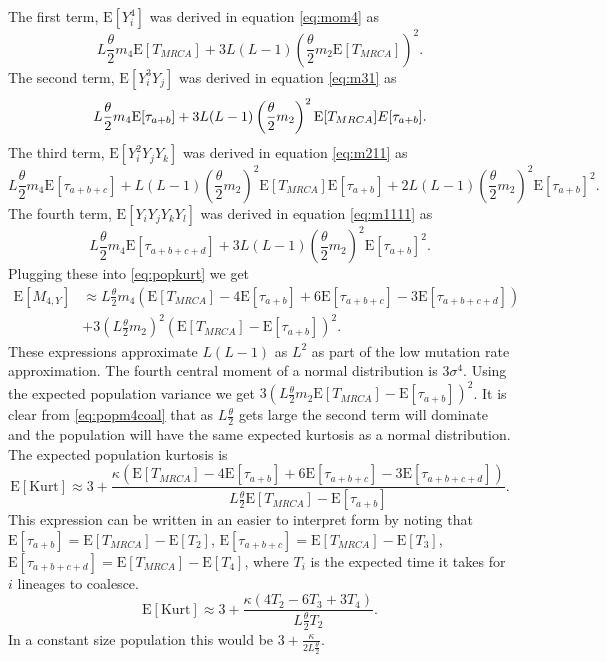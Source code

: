 \documentclass{article}
\newcommand{\T}{\frac{\theta}{2}}
\newcommand{\E}{\mathrm{E}}
\begin{document}
The first term, $\E[Y_i^4]$ was derived in equation \eqref{eq:mom4} as
\begin{equation*}
  L\T m_4 \E[T_{MRCA}] + 3L(L-1)\left( \T m_2 \E[T_{MRCA}] \right)^2.
\end{equation*}
The second term, $\E[Y_i^3Y_j]$ was derived in equation \eqref{eq:m31} as
\begin{equation*}
  L \T m_4 \E[\tau_{a+b}] + 3L(L-1) \left(\T m_2\right)^2 \E[T_{MRCA}]\\E[\tau_{a+b}].
\end{equation*}
The third term, $\E[Y_i^2Y_jY_k]$ was derived in equation \eqref{eq:m211} as
\begin{equation*}
  L \T m_4 \E[\tau_{a+b+c}] + L(L-1)\left(\T m_2\right)^2\E[T_{MRCA}]\E[\tau_{a+b}] +
  2L(L-1) \left(\T m_2\right)^2\E[\tau_{a+b}]^2.
\end{equation*}
The fourth term, $\E[Y_iY_jY_kY_l]$ was derived in equation \eqref{eq:m1111} as
\begin{equation*}
  L \T m_4 \E[\tau_{a+b+c+d}] + 3L(L-1)\left(\T m_2\right)^2\E[\tau_{a+b}]^2.
\end{equation*}
Plugging these into \eqref{eq:popkurt} we get
\begin{align}
  \label{eq:popm4coal}
  \E[M_{4,Y}] &\approx L \T m_4 \left( \E[T_{MRCA}] - 4\E[\tau_{a+b}] + 6\E[\tau_{a+b+c}] -3\E[\tau_{a+b+c+d}] \right)\nonumber \\
  &+ 3\left( L \T m_2 \right)^2\left(\E[T_{MRCA}]- \E[\tau_{a+b}]\right)^2.
\end{align}
These expressions approximate $L(L-1)$ as $L^2$ as part of the low mutation rate
approximation. The fourth central moment of a normal distribution is
$3\sigma^4$. Using the expected population  variance we get $3\left(L\T m_2
\E[T_{MRCA}]- \E[\tau_{a+b}]\right)^2$. It is clear from \eqref{eq:popm4coal} that
as $L\T$ gets large the second term will dominate and the population will have
the same expected kurtosis as a normal distribution. The expected population kurtosis
is
\begin{equation*}
  \E[\mbox{Kurt}] \approx 3 + \frac{\kappa( \E[T_{MRCA}] - 4\E[\tau_{a+b}] +
    6\E[\tau_{a+b+c}] -3\E[\tau_{a+b+c+d}])}{L \T \E[T_{MRCA}]- \E[\tau_{a+b}]}.
\end{equation*}
This expression can be written in an easier to interpret form by noting that
$\E[\tau_{a+b}]=\E[T_{MRCA}] - \E[T_2]$, $\E[\tau_{a+b+c}]=\E[T_{MRCA}] - \E[T_3]$,
$\E[\tau_{a+b+c+d}]=\E[T_{MRCA}] - \E[T_4]$, where $T_i$ is the expected time it
takes for $i$ lineages to coalesce.
\begin{equation}
  \label{eq:popkurtcoal}
  \E[\mbox{Kurt}] \approx 3 + \frac{\kappa( 4T_2 - 6T_3 + 3T_4)}{L \T T_2}.
\end{equation}
In a constant size population this would be $3 + \frac{\kappa}{2L\T}$.
\end{document}
